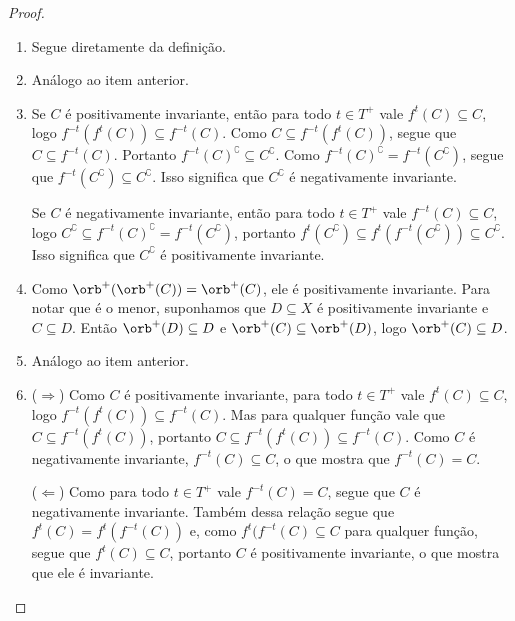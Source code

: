 \begin{proof}
	\begin{enumerate}
	\item Segue diretamente da definição.

	\item Análogo ao item anterior.

	\item %

Se $C$ é positivamente invariante, então para todo $t \in T^+$ vale $f^t(C) \subseteq C$, logo $f^{-t}(f^t(C)) \subseteq f^{-t}(C)$. Como $C \subseteq f^{-t}(f^t(C))$, segue que $C \subseteq f^{-t}(C)$. Portanto $f^{-t}(C)^\complement \subseteq C^\complement$. Como $f^{-t}(C)^\complement = f^{-t}(C^\complement)$, segue que $f^{-t}(C^\complement) \subseteq C^\complement$.  Isso significa que $C^\complement$ é negativamente invariante.

Se $C$ é negativamente invariante, então para todo $t \in T^+$ vale $f^{-t}(C) \subseteq C$, logo $C^\complement \subseteq f^{-t}(C)^\complement = f^{-t}(C^\complement)$, portanto $f^t(C^\complement) \subseteq f^t(f^{-t}(C^\complement)) \subseteq C^\complement$. Isso significa que $C^\complement$ é positivamente invariante.

	\item Como $\orb^+(\orb^+(C)) = \orb^+(C)$, ele é positivamente invariante. Para notar que é o menor, suponhamos que $D \subseteq X$ é positivamente invariante e $C \subseteq D$. Então $\orb^+(D) \subseteq D$ e $\orb^+(C) \subseteq \orb^+(D)$, logo $\orb^+(C) \subseteq D$.

	\item Análogo ao item anterior.

	\item ($\Rightarrow$) Como $C$ é positivamente invariante, para todo $t \in T^+$ vale $f^t(C) \subseteq C$, logo $f^{-t}(f^t(C)) \subseteq f^{-t}(C)$. Mas para qualquer função vale que $C \subseteq f^{-t}(f^t(C))$, portanto $C \subseteq f^{-t}(f^t(C)) \subseteq f^{-t}(C)$. Como $C$ é negativamente invariante, $f^{-t}(C) \subseteq C$, o que mostra que $f^{-t}(C)=C$.

($\Leftarrow$) Como para todo $t \in T^+$ vale $f^{-t}(C) = C$, segue que $C$ é negativamente invariante. Também dessa relação segue que $f^t(C) = f^t(f^{-t}(C))$ e, como $f^t(f^{-t}(C) \subseteq C$ para qualquer função, segue que $f^t(C) \subseteq C$, portanto $C$ é positivamente invariante, o que mostra que ele é invariante.


\end{enumerate}
\end{proof}
